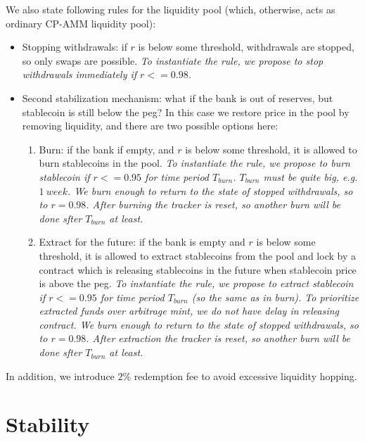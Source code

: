 \documentclass{article}   %
\newcommand{\sct}{stablecoin}
\begin{document}
We also state following rules for the liquidity pool (which, otherwise, acts as ordinary CP-AMM liquidity pool): 

\begin{itemize}
   \item{Stopping withdrawals: } if $r$ is below some threshold, withdrawals are stopped, so only swaps are possible.  
   \em{To instantiate the rule, we propose to stop withdrawals immediately if $r <= 0.98$.}

   \item{Second stabilization mechanism: } what if the bank is out of reserves, but \sct{} is still below the peg? In this case we restore price in the pool by removing liquidity, and there are two possible options here:

   \begin{enumerate}
   \item{Burn: } if the bank if empty, and $r$ is below some threshold, it is allowed to burn \sct{}s in the pool. 
   \em{To instantiate the rule, we propose to burn \sct{} if $r <= 0.95$ for time period $T_{burn}$. $T_{burn}$ must be quite big, e.g. $1 {\ week}$. We burn enough to return to the state of stopped withdrawals, so to $r = 0.98$. After burning the tracker is reset, so another burn will be done sfter $T_{burn}$ at least.}

   \item{Extract for the future: } if the bank is empty and $r$ is below some threshold, it is allowed to extract \sct{}s from the pool and lock by a contract which is releasing \sct{}s in the future when \sct{} price is above the peg.
   \em{To instantiate the rule, we propose to extract \sct{} if $r <= 0.95$ for time period $T_{burn}$ (so the same as in burn). 
   To prioritize extracted funds over arbitrage mint, we do not have delay in releasing contract. We burn enough to return to the state of stopped withdrawals, so to $r = 0.98$. After extraction the tracker is reset, so another burn will be done sfter $T_{burn}$ at least.}
   \end{enumerate}
\end{itemize} 

In addition, we introduce $2\%$ redemption fee to avoid excessive liquidity hopping.

\section{Stability}
\end{document}

